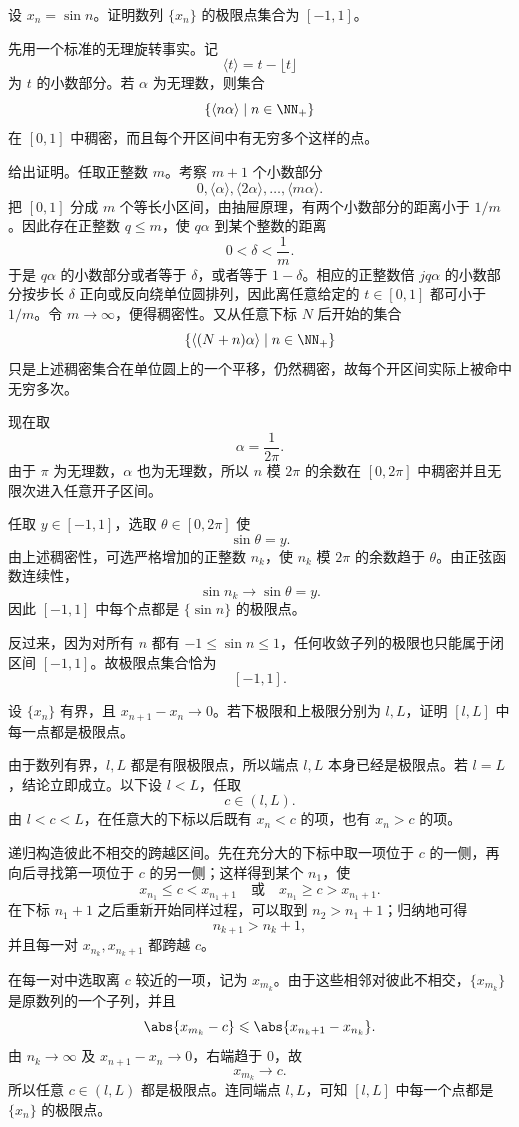 \begin{xreferenceproblem}[第二组参考题 9]
设 $x_n=\sin n$。证明数列 $\{x_n\}$ 的极限点集合为 $[-1,1]$。
\end{xreferenceproblem}
\begin{xsolution}
先用一个标准的无理旋转事实。记
\[
  \langle t\rangle=t-\lfloor t\rfloor
\]
为 $t$ 的小数部分。若 $\alpha$ 为无理数，则集合
\[
  \{\langle n\alpha\rangle\mid n\in\NN_+\}
\]
在 $[0,1]$ 中稠密，而且每个开区间中有无穷多个这样的点。

给出证明。任取正整数 $m$。考察 $m+1$ 个小数部分
\[
  0,\langle\alpha\rangle,\langle2\alpha\rangle,\ldots,\langle m\alpha\rangle.
\]
把 $[0,1]$ 分成 $m$ 个等长小区间，由抽屉原理，有两个小数部分的距离小于 $1/m$。因此存在正整数 $q\leqslant m$，使 $q\alpha$ 到某个整数的距离
\[
  0<\delta<\frac1m.
\]
于是 $q\alpha$ 的小数部分或者等于 $\delta$，或者等于 $1-\delta$。相应的正整数倍 $jq\alpha$ 的小数部分按步长 $\delta$ 正向或反向绕单位圆排列，因此离任意给定的 $t\in[0,1]$ 都可小于 $1/m$。令 $m\to\infty$，便得稠密性。又从任意下标 $N$ 后开始的集合
\[
  \{\langle(N+n)\alpha\rangle\mid n\in\NN_+\}
\]
只是上述稠密集合在单位圆上的一个平移，仍然稠密，故每个开区间实际上被命中无穷多次。

现在取
\[
  \alpha=\frac1{2\pi}.
\]
由于 $\pi$ 为无理数，$\alpha$ 也为无理数，所以 $n$ 模 $2\pi$ 的余数在 $[0,2\pi]$ 中稠密并且无限次进入任意开子区间。

任取 $y\in[-1,1]$，选取 $\theta\in[0,2\pi]$ 使
\[
  \sin\theta=y.
\]
由上述稠密性，可选严格增加的正整数 $n_k$，使 $n_k$ 模 $2\pi$ 的余数趋于 $\theta$。由正弦函数连续性，
\[
  \sin n_k\to\sin\theta=y.
\]
因此 $[-1,1]$ 中每个点都是 $\{\sin n\}$ 的极限点。

反过来，因为对所有 $n$ 都有 $-1\leqslant\sin n\leqslant1$，任何收敛子列的极限也只能属于闭区间 $[-1,1]$。故极限点集合恰为
\[
  \boxed{[-1,1]}.
\]
\end{xsolution}

\begin{xreferenceproblem}[第二组参考题 10]
设 $\{x_n\}$ 有界，且 $x_{n+1}-x_n\to0$。若下极限和上极限分别为 $l,L$，证明 $[l,L]$ 中每一点都是极限点。
\end{xreferenceproblem}
\begin{xsolution}
由于数列有界，$l,L$ 都是有限极限点，所以端点 $l,L$ 本身已经是极限点。若 $l=L$，结论立即成立。以下设 $l<L$，任取
\[
  c\in(l,L).
\]
由 $l<c<L$，在任意大的下标以后既有 $x_n<c$ 的项，也有 $x_n>c$ 的项。

递归构造彼此不相交的跨越区间。先在充分大的下标中取一项位于 $c$ 的一侧，再向后寻找第一项位于 $c$ 的另一侧；这样得到某个 $n_1$，使
\[
  x_{n_1}\leqslant c<x_{n_1+1}
  \quad\text{或}\quad
  x_{n_1}\geqslant c>x_{n_1+1}.
\]
在下标 $n_1+1$ 之后重新开始同样过程，可以取到 $n_2>n_1+1$；归纳地可得
\[
  n_{k+1}>n_k+1,
\]
并且每一对 $x_{n_k},x_{n_k+1}$ 都跨越 $c$。

在每一对中选取离 $c$ 较近的一项，记为 $x_{m_k}$。由于这些相邻对彼此不相交，$\{x_{m_k}\}$ 是原数列的一个子列，并且
\[
  \abs{x_{m_k}-c}
  \leqslant\abs{x_{n_k+1}-x_{n_k}}.
\]
由 $n_k\to\infty$ 及 $x_{n+1}-x_n\to0$，右端趋于 $0$，故
\[
  x_{m_k}\to c.
\]
所以任意 $c\in(l,L)$ 都是极限点。连同端点 $l,L$，可知 $[l,L]$ 中每一个点都是 $\{x_n\}$ 的极限点。
\end{xsolution}
